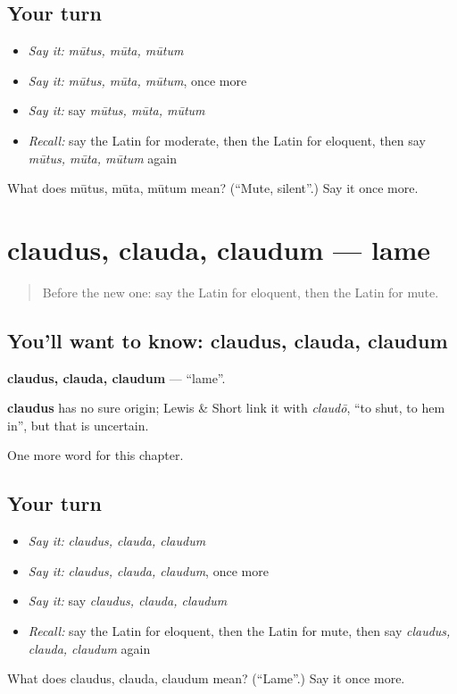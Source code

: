 \subsection*{Your turn}
\begin{itemize}
\raggedright
  \item \emph{Say it:} \emph{mūtus, mūta, mūtum}
  \item \emph{Say it:} \emph{mūtus, mūta, mūtum}, once more
  \item \emph{Say it:} say \emph{mūtus, mūta, mūtum}
  \item \emph{Recall:} say the Latin for moderate, then the Latin for eloquent, then say \emph{mūtus, mūta, mūtum} again
\end{itemize}

\begin{tcolorbox}[breakable,colback=teal!4,colframe=teal!35!black,title={Before you move on}]
What does mūtus, mūta, mūtum mean? (\textquotedblleft{}Mute, silent\textquotedblright{}.) Say it once more.
\end{tcolorbox}
\section[claudus, clauda, claudum]{claudus, clauda, claudum — lame}

\label{lesson:LA-C184-claudus}



\begin{quote}
Before the new one: say the Latin for eloquent, then the Latin for mute.
\end{quote}

\subsection*{You'll want to know: claudus, clauda, claudum}
\textbf{claudus, clauda, claudum} — \textquotedblleft{}lame\textquotedblright{}.

\begin{cousinweb}
\textbf{claudus} has no sure origin; Lewis \& Short link it with \emph{claudō}, \textquotedblleft{}to shut, to hem in\textquotedblright{}, but that is uncertain.
\end{cousinweb}

\begin{grammarlens}[title={What you've built}]
One more word for this chapter.
\end{grammarlens}

\subsection*{Your turn}
\begin{itemize}
\raggedright
  \item \emph{Say it:} \emph{claudus, clauda, claudum}
  \item \emph{Say it:} \emph{claudus, clauda, claudum}, once more
  \item \emph{Say it:} say \emph{claudus, clauda, claudum}
  \item \emph{Recall:} say the Latin for eloquent, then the Latin for mute, then say \emph{claudus, clauda, claudum} again
\end{itemize}

\begin{tcolorbox}[breakable,colback=teal!4,colframe=teal!35!black,title={Before you move on}]
What does claudus, clauda, claudum mean? (\textquotedblleft{}Lame\textquotedblright{}.) Say it once more.
\end{tcolorbox}
